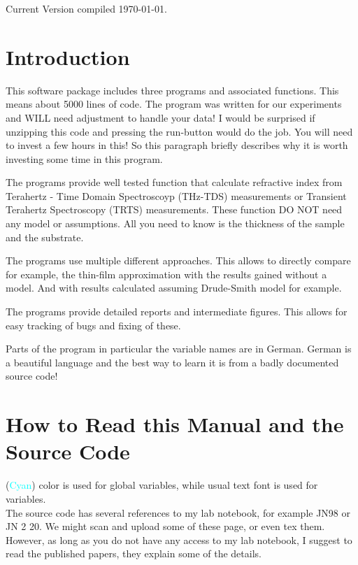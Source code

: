 \documentclass[12pt]{article}
\begin{document}
\newcommand{\TDS}{Evaluation\_TDS.m}
\newcommand{\pellet}{Evaluation\_TDS\_Pellets.m}
\newcommand{\Pellet}{\pellet}
\newcommand{\pellets}{\pellet}
\newcommand{\TRTS}{Evaluation\_TRTS.m}
\newcommand{\achtung}{\\ \textcolor{red}{!}}
Current Version compiled \today.
\tableofcontents
\newpage
\section{Introduction}
This software package includes three programs and associated functions. This means about 5000 lines of code. The program was written for our experiments and WILL need adjustment to handle your data! I would be surprised if unzipping this code and pressing the run-button would do the job. You will need to invest a few hours in this! 
So this paragraph briefly describes why it is worth investing some time in this program. 

The programs provide well tested function that calculate refractive index from Terahertz - Time Domain Spectroscoyp (THz-TDS) measurements or Transient Terahertz Spectroscopy (TRTS) measurements. These function DO NOT need any model or assumptions. All you need to know is the thickness of the sample and the substrate. 

The programs use multiple different approaches. This allows to directly compare for example, the thin-film approximation with the results gained without a model. And with results calculated assuming Drude-Smith model for example. 

The programs provide detailed reports and intermediate figures. This allows for easy tracking of bugs and fixing of these. 

Parts of the program in particular the variable names are in German. German is a beautiful language and the best way to learn it is from a badly documented source code! 

\section{How to Read this Manual and the Source Code}
(\textcolor{cyan}{Cyan}) color is used for global variables, while usual text font is used for variables. \\
The source code has several references to my lab notebook, for example JN98 or JN 2 20. We might scan and upload some of these page, or even tex them. However, as long as you do not have any access to my lab notebook, I suggest to read the published papers, they explain some of the details. 
\end{document}
